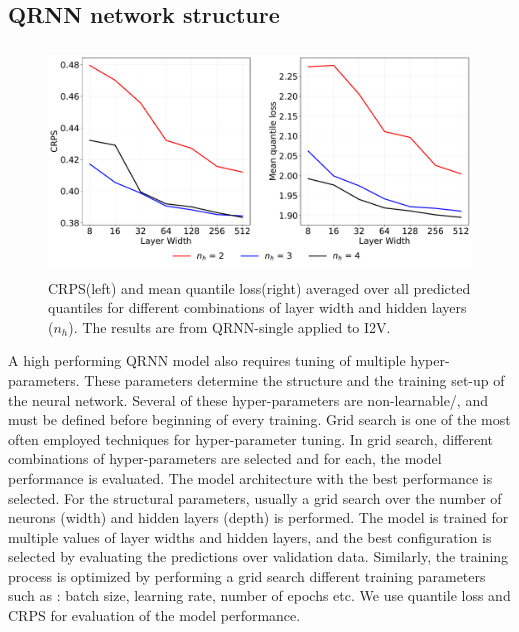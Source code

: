 \documentclass[amt, manuscript]{copernicus}
\begin{document}
\subsection{QRNN network structure}
\label{appendix:hyperparamter}
%
\begin{figure}[t]
	\centering
	\includegraphics[height=60mm]{Figures/CRPS.pdf} 
	\caption{CRPS(left) and mean quantile loss(right) averaged over all predicted quantiles for different combinations of layer width and hidden layers ($n_h$). The results are from QRNN-single applied to I2V.}
	\label{fig:grid_search}	
\end{figure}
A high performing QRNN model also requires tuning of multiple hyper-parameters. These parameters determine the structure and the training set-up of the neural network. Several of these hyper-parameters are non-learnable/, and must be defined before beginning of every training. Grid search is one of the most often employed techniques for hyper-parameter tuning. In grid search, different combinations of hyper-parameters are selected and for each, the model performance is evaluated. The model architecture with the best performance is selected. For the structural parameters, usually a grid search over the number of neurons (width) and hidden layers (depth) is performed. The model is trained for multiple values of layer widths and hidden layers, and the best configuration is selected by evaluating the predictions over validation data. Similarly, the training process is optimized by performing a grid search different training parameters such as : batch size, learning rate, number of epochs etc. We use quantile loss and CRPS for evaluation of the model performance.
\end{document}
